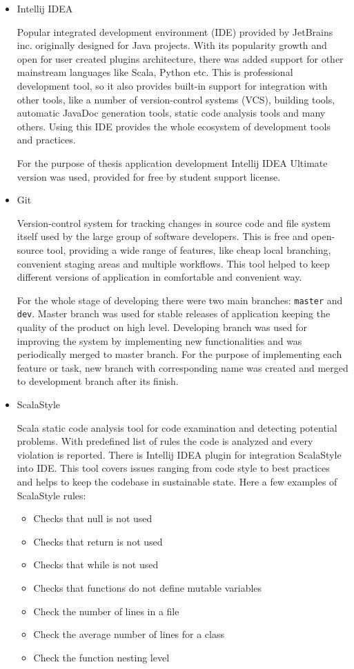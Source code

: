 \begin{itemize}
\item Intellij IDEA

Popular integrated development environment (IDE) provided by JetBrains inc. originally designed for Java projects. With its popularity growth and open for user created plugins architecture, there was added support for other mainstream languages like Scala, Python etc. This is professional development tool, so it also provides built-in support for integration with other tools, like a number of version-control systems (VCS), building tools, automatic JavaDoc generation tools, static code analysis tools and many others. Using this IDE provides the whole ecosystem of development tools and practices. 

For the purpose of thesis application development Intellij IDEA Ultimate version was used, provided for free by student support license.
\smallskip

\item Git

Version-control system for tracking changes in source code and file system itself used by the large group of software developers. This is free and open-source tool, providing a wide range of features, like cheap local branching, convenient staging areas and multiple workflows. This tool helped to keep different versions of application in comfortable and convenient way. 

For the whole stage of developing there were two main branches: \texttt{master} and \texttt{dev}. Master branch was used for stable releases of application keeping the quality of the product on high level. Developing branch was used for improving the system by implementing new functionalities and was periodically merged to master branch. For the purpose of implementing each feature or task, new branch with corresponding name was created and merged to development branch after its finish.
\smallskip

\item ScalaStyle

Scala static code analysis tool for code examination and detecting potential problems. With predefined list of rules the code is analyzed and every violation is reported. There is Intellij IDEA plugin for integration ScalaStyle into IDE. This tool covers issues ranging from code style to best practices and helps to keep the codebase in sustainable state. Here a few examples of ScalaStyle rules:
\begin{itemize}
\item Checks that null is not used
\item Checks that return is not used
\item Checks that while is not used
\item Checks that functions do not define mutable variables
\item Check the number of lines in a file
\item Check the average number of lines for a class
\item Check the function nesting level
\end{itemize}


\end{itemize}
